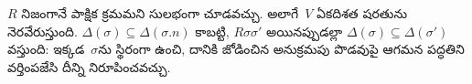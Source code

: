 \documentclass[../../../include/open-logic-section]{subfiles}
\begin{document}
$R$ నిజంగానే పాక్షిక క్రమమని సులభంగా
చూడవచ్చు. అలాగే~$V$ ఏకదిశత షరతును
నెరవేరుస్తుంది.
$\Delta(\sigma)
\subseteq \Delta(\sigma.n)$ కాబట్టి,
$R\sigma\sigma'$ అయినప్పుడల్లా
$\Delta(\sigma)
\subseteq \Delta(\sigma')$ వస్తుంది:
ఇక్కడ~$\sigma$ను స్థిరంగా ఉంచి, దానికి జోడించిన
అనుక్రమపు పొడవుపై ఆగమన పద్ధతిని వర్తింపజేసి
దీన్ని నిరూపించవచ్చు.
\end{document}
